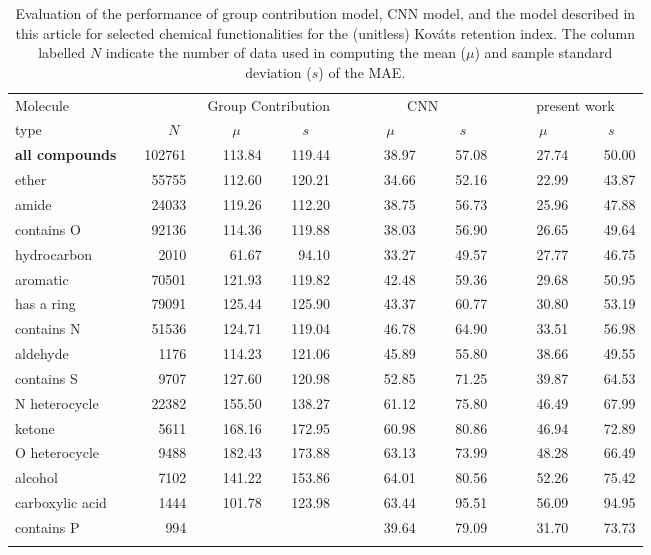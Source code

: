 \documentclass{IEEEcsmag}
\newcommand*{\kovats}{Kov\'ats\xspace}
\begin{document}
\begin{table}[t]
\centering
\caption{Evaluation of the performance of group contribution model\cite{2007Stein}, CNN model\cite{2019Matyushin}, and the model described in this article for selected chemical functionalities for the (unitless) \kovats retention index. The column labelled $N$ indicate the number of data used in computing the mean ($\mu$) and sample standard deviation ($s$) of the MAE.}
\begin{tabular*}{0.85\textwidth}{@{\extracolsep{\fill}} l r r r c r r c r r}
\hline
\hline\noalign{\smallskip}
Molecule & & \multicolumn{2}{c}{Group Contribution} && \multicolumn{2}{c}{~~~~~~~CNN~~~~~~~} && \multicolumn{2}{c}{~~~present work~~~} \\
\noalign{\smallskip}\cline{3-4} \cline{6-7} \cline{9-10} \noalign{\smallskip}
type & $N$~~ & $\mu$~~~ & $s$~~~ && $\mu$~~~ & $s$~~~ && $\mu$~~~ & $s$~~~ \\
\noalign{\smallskip}\hline\noalign{\smallskip}
{\bf all compounds} & ~~102761~ & 113.84 & 119.44 &&  38.97 &  57.08 &&  27.74 &  50.00 \\
ether               &  55755~ & 112.60 & 120.21 &&  34.66 &  52.16 &&  22.99 &  43.87 \\
amide               &  24033~ & 119.26 & 112.20 &&  38.75 &  56.73 &&  25.96 &  47.88 \\
contains O          &  92136~ & 114.36 & 119.88 &&  38.03 &  56.90 &&  26.65 &  49.64 \\
hydrocarbon         &   2010~ &  61.67 &  94.10 &&  33.27 &  49.57 &&  27.77 &  46.75 \\
aromatic            &  70501~ & 121.93 & 119.82 &&  42.48 &  59.36 &&  29.68 &  50.95 \\
has a ring          &  79091~ & 125.44 & 125.90 &&  43.37 &  60.77 &&  30.80 &  53.19 \\
contains N          &  51536~ & 124.71 & 119.04 &&  46.78 &  64.90 &&  33.51 &  56.98 \\
aldehyde            &   1176~ & 114.23 & 121.06 &&  45.89 &  55.80 &&  38.66 &  49.55 \\
contains S          &   9707~ & 127.60 & 120.98 &&  52.85 &  71.25 &&  39.87 &  64.53 \\
N heterocycle       &  22382~ & 155.50 & 138.27 &&  61.12 &  75.80 &&  46.49 &  67.99 \\
ketone              &   5611~ & 168.16 & 172.95 &&  60.98 &  80.86 &&  46.94 &  72.89 \\
O heterocycle       &   9488~ & 182.43 & 173.88 &&  63.13 &  73.99 &&  48.28 &  66.49 \\
alcohol             &   7102~ & 141.22 & 153.86 &&  64.01 &  80.56 &&  52.26 &  75.42 \\
carboxylic acid     &   1444~ & 101.78 & 123.98 &&  63.44 &  95.51 &&  56.09 &  94.95 \\
contains P          &    994~ &        &        && 39.64 &  79.09 &&  31.70 &  73.73 \\
\noalign{\smallskip}\hline
\hline
\end{tabular*}

\label{table:comparison1}
\end{table}
\end{document}
